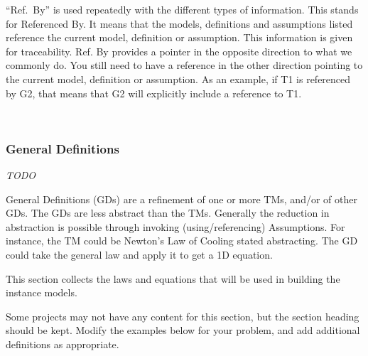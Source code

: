 \documentclass[12pt]{article}
\begin{document}

``Ref.\ By'' is used repeatedly with the different types of information.
  This stands for Referenced By.  It means that the models, definitions and
  assumptions listed reference the current model, definition or assumption.
  This information is given for traceability.  Ref. By provides a pointer in the
  opposite direction to what we commonly do.  You still need to have a reference
  in the other direction pointing to the current model, definition or
  assumption.  As an example, if T1 is referenced by G2, that means that G2 will
  explicitly include a reference to T1.

~\newline

\subsubsection{General Definitions}\label{sec_gendef}

\emph{TODO}

General Definitions (GDs) are a refinement of one or more TMs, and/or of other
GDs.  The GDs are less abstract than the TMs.  Generally the reduction in
abstraction is possible through invoking (using/referencing) Assumptions. For
instance, the TM could be Newton's Law of Cooling stated abstracting.  The GD
could take the general law and apply it to get a 1D equation.

This section collects the laws and equations that will be used in building the
instance models.

Some projects may not have any content for this section, but the section heading
should be kept.  Modify the examples below for your problem, and add additional
definitions as appropriate.

~\newline
\end{document}
